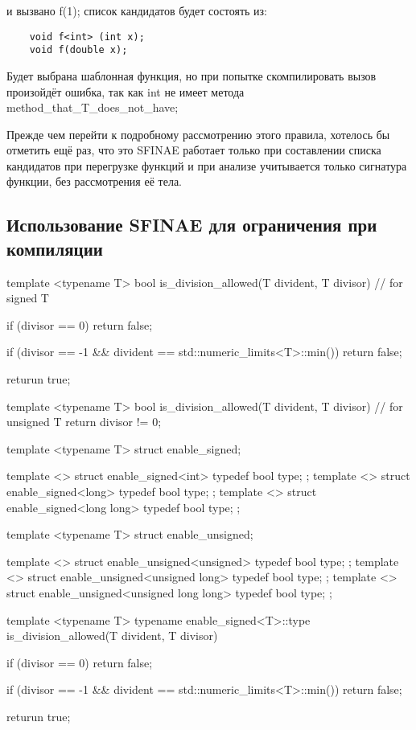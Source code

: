 	и вызвано f(1);
	список кандидатов будет состоять из:
	
	\begin{verbatim}
	void f<int> (int x);
	void f(double x);
	\end{verbatim}

	Будет выбрана шаблонная функция, но при попытке скомпилировать вызов произойдёт ошибка, так как int не имеет метода method\_that\_T\_does\_not\_have;

	Прежде чем перейти к подробному рассмотрению этого правила, хотелось бы отметить ещё раз, что это SFINAE работает только при составлении списка кандидатов при перегрузке функций и при анализе учитывается только сигнатура функции, без рассмотрения её тела.

\subsection{Использование SFINAE для ограничения при компиляции}

    
template <typename T>
bool is_division_allowed(T divident, T divisor) // for signed T
{
    if (divisor == 0)
        return false;

    if (divisor == -1 && divident == std::numeric_limits<T>::min())
        return false;

    returun true;
}

template <typename T>
bool is_division_allowed(T divident, T divisor) // for unsigned T
{
    return divisor != 0;
}

template <typename T>
struct enable_signed;

template <> struct enable_signed<int> { typedef bool type; };
template <> struct enable_signed<long> { typedef bool type; };
template <> struct enable_signed<long long> { typedef bool type; };

template <typename T>
struct enable_unsigned;

template <> struct enable_unsigned<unsigned> { typedef bool type; };
template <> struct enable_unsigned<unsigned long> { typedef bool type; };
template <> struct enable_unsigned<unsigned long long> { typedef bool type; };


template <typename T>
typename enable_signed<T>::type is_division_allowed(T divident, T divisor)
{
    if (divisor == 0)
        return false;

    if (divisor == -1 && divident == std::numeric_limits<T>::min())
        return false;

    returun true;
}

